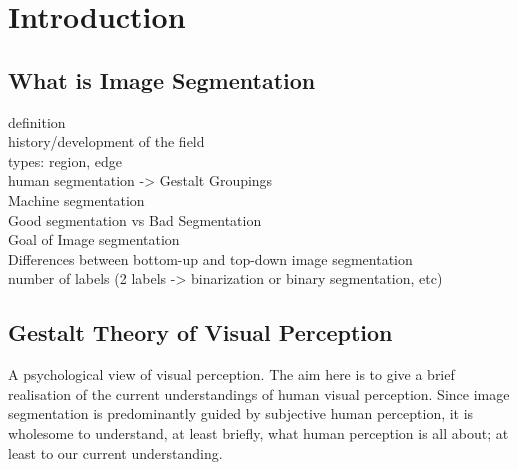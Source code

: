 
\chapter{Introduction} %

\label{chap:Chapter1} %


\newcommand{\keyword}[1]{\textbf{#1}}
\newcommand{\tabhead}[1]{\textbf{#1}}
\newcommand{\code}[1]{\texttt{#1}}
\newcommand{\file}[1]{\texttt{\bfseries#1}}
\newcommand{\option}[1]{\texttt{\itshape#1}}


\section{What is Image Segmentation}

definition\\
history/development of the field\\
types: region, edge\\
human segmentation -> Gestalt Groupings\\
Machine segmentation\\
Good segmentation vs Bad Segmentation\\
Goal of Image segmentation\\
Differences between bottom-up and top-down image segmentation\\
number of labels (2 labels -> binarization or binary segmentation, etc)


\section{Gestalt Theory of Visual Perception}

A psychological view of visual perception. The aim here is to give a brief realisation of the current understandings of human visual perception. Since image segmentation is predominantly guided by subjective human perception, it is wholesome to understand, at least briefly, what human perception is all about; at least to our current understanding.

